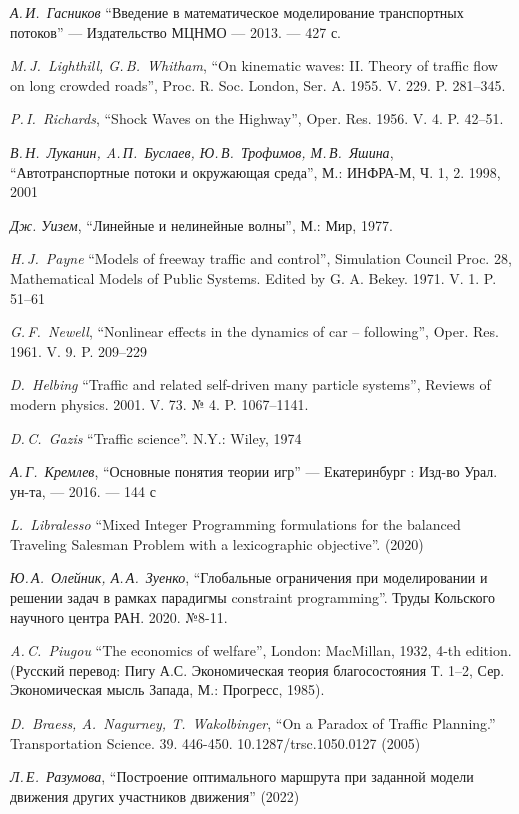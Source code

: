 \documentclass[12pt, a4paper]{article}
\begin{document}
    \newpage
\begin{thebibliography}{0}
	
		
	 \textit{А.\,И.~Гасников} ``Введение в математическое моделирование транспортных потоков'' --- Издательство МЦНМО --- 2013. --- 427 с.
	
	 \textit{M.\,J.~Lighthill, G.\,B.~Whitham}, ``On kinematic waves: II. Theory of traffic flow on long crowded roads'', Proc. R. Soc. London, Ser. A. 1955.
	V. 229. P. 281–345.
	
	 \textit{P.\,I.~Richards}, ``Shock Waves on the Highway'', Oper. Res. 1956. V. 4. P. 42–51.
	
	 \textit{В.\,Н.~Луканин, A.\,П.~Буслаев, Ю.\,В.~Трофимов, М.\,В.~Яшина}, ``Автотранспортные потоки и окружающая среда'', М.: ИНФРА-М, Ч. 1, 2.
	1998, 2001
	
	 \textit{Дж. Уизем}, ``Линейные и нелинейные волны'', М.: Мир, 1977.
	
	 \textit{H.\,J.~Payne} ``Models of freeway traffic and control'', Simulation Council Proc. 28, Mathematical Models of Public Systems. Edited by G. A. Bekey. 1971. V. 1. P. 51–61
	
	 \textit{G.\,F.~Newell}, ``Nonlinear effects in the dynamics of car – following'', Oper. Res. 1961. V. 9. P. 209–229
	
	 \textit{D.~Helbing} ``Traffic and related self-driven many particle systems'', Reviews of modern physics. 2001. V. 73. № 4. P. 1067–1141.

	 \textit{D.\,C.~Gazis} ``Traffic science''. N.Y.: Wiley, 1974
	
	 \textit{А.\,Г.~Кремлев}, ``Основные понятия теории игр'' --- Екатеринбург : Изд-во Урал. ун-та, --- 2016. --- 144 с
		
	 \textit{L.~Libralesso} ``Mixed Integer Programming formulations for the balanced Traveling Salesman Problem with a lexicographic objective''. (2020)
	
	 \textit{Ю.\,А.~Олейник, А.\,А.~Зуенко}, ``Глобальные ограничения при моделировании и решении задач в рамках парадигмы constraint programming''. Труды Кольского научного центра РАН. 2020. №8-11.
	
	 \textit{A.\,C.~Piugou} ``The economics of welfare'', London: MacMillan, 1932,
	4-th edition. (Русский перевод: Пигу А.С. Экономическая теория благосостояния Т. 1–2, Сер. Экономическая мысль Запада,
	М.: Прогресс, 1985).
		
	 \textit{D.~Braess, A.~Nagurney, T.~Wakolbinger}, ``On a Paradox of Traffic Planning.'' Transportation Science. 39. 446-450. 10.1287/trsc.1050.0127 (2005)
	
	 \textit{Л.\,Е.~Разумова}, ``Построение оптимального маршрута при заданной модели движения других участников движения'' (2022)

\end{thebibliography} 
\end{document}

